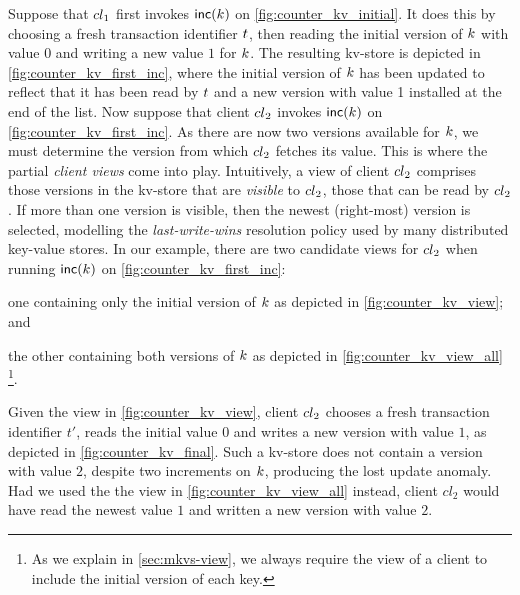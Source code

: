 Suppose that \({cl}_1\) first invokes \(\mathsf{inc}(k)\) on
\cref{fig:counter_kv_initial}.
It does this by choosing a fresh transaction identifier \(t\), 
 then reading the initial version
of \(k\) with value \(0\) 
and writing  a new value \(1\) for \(k\). 
The resulting kv-store is depicted in \cref{fig:counter_kv_first_inc},
where  the initial version of \(k\)  has been  updated to reflect that it
has been read by \(t\) and a new version with value 1 installed at
the end of the list. 
Now suppose that client \({cl}_2\) invokes \(\mathsf{inc}(k)\)  on
\cref{fig:counter_kv_first_inc}.  As there are now two versions
available for \(k\), we must determine the version from which
\({cl}_2\) fetches its value.
This is where the partial \emph{client views} come into play.  Intuitively, a view of
client \({cl}_2\) comprises those versions in the kv-store that are
\emph{visible} to \({cl}_2\), \ie those that can be read by
\({cl}_2\).  If more than one version is visible, then the newest
(right-most) version is selected, modelling the \emph{last-write-wins}
resolution policy used by many distributed key-value stores.
In our example, there are two  candidate views for \({cl}_2\) when running
\(\mathsf{inc}(k)\) on \cref{fig:counter_kv_first_inc}: 
\begin{enumerate*}
\item one containing
only the initial version of \(k\) as depicted in \cref{fig:counter_kv_view}; and
\item the other containing both versions of \(k\) as depicted in \cref{fig:counter_kv_view_all}%
\footnote{As we explain in \cref{sec:mkvs-view}, we always require
  the view of a client to include the initial version of each key.}.
\end{enumerate*}
Given the view in \cref{fig:counter_kv_view},
client \({cl}_2\) chooses a fresh
transaction identifier \(t'\), reads the initial value \(0\) and writes a
new version with value \(1\), as depicted in \cref{fig:counter_kv_final}. 
Such a kv-store does not contain a
version with value \(2\), despite two increments on \(k\), producing
the lost update anomaly. 
Had we used the the view in \cref{fig:counter_kv_view_all} instead,
client \(cl_2\) would have read the newest
value \(1\) and written a new version with value \(2\).


